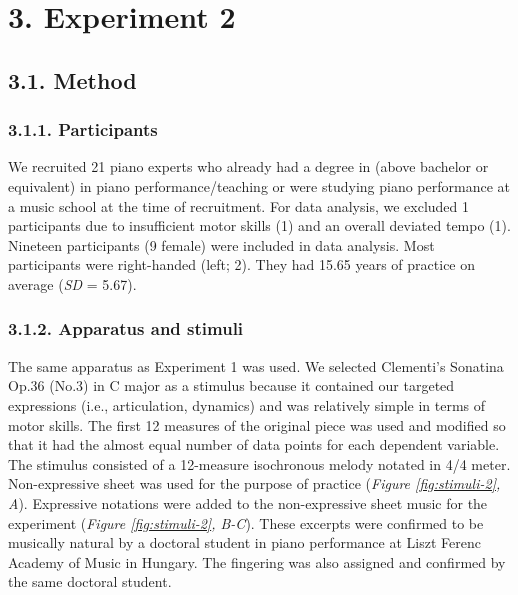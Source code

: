 \documentclass[
  english,
  man,floatsintext]{apa6}
\begin{document}
\newpage

\hypertarget{experiment-2}{%
\section{3. Experiment 2}\label{experiment-2}}

\hypertarget{method-1}{%
\subsection{3.1. Method}\label{method-1}}

\hypertarget{participants-1}{%
\subsubsection{3.1.1. Participants}\label{participants-1}}

We recruited 21 piano experts who already had a degree in (above bachelor or equivalent) in piano performance/teaching or were studying piano performance at a music school at the time of recruitment. For data analysis, we excluded 1 participants due to insufficient motor skills (1) and an overall deviated tempo (1). Nineteen participants (9 female) were included in data analysis. Most participants were right-handed (left; 2). They had 15.65 years of practice on average (\emph{SD} = 5.67).

\hypertarget{apparatus-and-stimuli-1}{%
\subsubsection{3.1.2. Apparatus and stimuli}\label{apparatus-and-stimuli-1}}

The same apparatus as Experiment 1 was used. We selected Clementi's Sonatina Op.36 (No.3) in C major as a stimulus because it contained our targeted expressions (i.e., articulation, dynamics) and was relatively simple in terms of motor skills. The first 12 measures of the original piece was used and modified so that it had the almost equal number of data points for each dependent variable. The stimulus consisted of a 12-measure isochronous melody notated in 4/4 meter. Non-expressive sheet was used for the purpose of practice (\emph{Figure \ref{fig:stimuli-2}, A}). Expressive notations were added to the non-expressive sheet music for the experiment (\emph{Figure \ref{fig:stimuli-2}, B-C}). These excerpts were confirmed to be musically natural by a doctoral student in piano performance at Liszt Ferenc Academy of Music in Hungary. The fingering was also assigned and confirmed by the same doctoral student.
\end{document}
